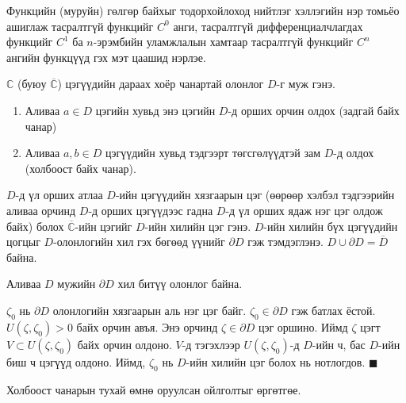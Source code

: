 Функцийн (муруйн) гөлгөр байхыг тодорхойлоход нийтлэг хэллэгийн нэр томьёо ашиглаж тасралтгүй функцийг $C^0$ анги, тасралтгүй дифференциалчлагдах функцийг  $C^1$ ба $n$-эрэмбийн уламжлалын хамтаар тасралтгүй функцийг $C^n$ ангийн функцүүд  гэх мэт цаашид нэрлэе.
\begin{dfn}
$\mathbb{C}$ (буюу $\overline{\mathbb{C}}$) цэгүүдийн дараах хоёр чанартай олонлог $D$-г муж  гэнэ.
\begin{enumerate}
    \item [a)] Аливаа $a\in D$ цэгийн хувьд энэ цэгийн $D$-д орших орчин олдох (задгай байх чанар)
    \item [б)] Аливаа $a,b\in D$ цэгүүдийн хувьд тэдгээрт төгсгөлүүдтэй зам $D$-д олдох (холбоост байх чанар).
\end{enumerate}

$D$-д үл орших атлаа $D$-ийн цэгүүдийн хязгаарын цэг (өөрөөр хэлбэл тэдгээрийн аливаа орчинд $D$-д орших цэгүүдээс гадна $D$-д үл орших ядаж нэг цэг олдож байх) болох $\overline{\mathbb{C}}$-ийн цэгийг $D$-ийн хилийн цэг  гэнэ. $D$-ийн хилийн бүх цэгүүдийн цогцыг $D$-олонлогийн хил гэх бөгөөд үүнийг $\partial D$ гэж тэмдэглэнэ. \qquad $D\cup \partial D=\overline{D}$ байна.
\end{dfn}
\begin{thm}
Аливаа $D$ мужийн $\partial D$ хил битүү олонлог байна. 
\end{thm}
\begin{prf}
$\zeta _0$ нь $\partial D$ олонлогийн хязгаарын аль нэг цэг байг. $\zeta _0\in \partial D$ гэж батлах ёстой. $U(\zeta, \zeta_0)>0$ байх орчин авъя. Энэ орчинд $\zeta \in\partial D$ цэг оршино. Иймд $\zeta$ цэгт $V\subset U(\zeta, \zeta_0)$ байх орчин олдоно. $V$-д тэгэхлээр $U(\zeta, \zeta_0)$-д $D$-ийн ч, бас $D$-ийн биш ч цэгүүд олдоно. Иймд, $\zeta _0$ нь $D$-ийн хилийн цэг болох нь нотлогдов.
\hfill $\blacksquare$\end{prf}
Холбоост чанарын тухай өмнө оруулсан ойлголтыг өргөтгөе.
